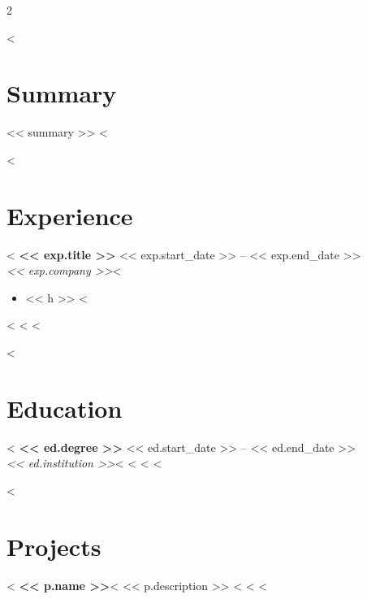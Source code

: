 \documentclass[10pt,a4paper]{article}
\begin{document}
\begin{paracol}{2}
\switchcolumn

<%
\section*{Summary}
<< summary >>
<%

<%
\section*{Experience}
<%
\textbf{<< exp.title >>} \hfill << exp.start_date >> -- << exp.end_date >>\\
\textit{<< exp.company >>}<%
\begin{itemize}
<%
    \item << h >>
<%
\end{itemize}
<%
\vspace{4pt}
<%
<%

<%
\section*{Education}
<%
\textbf{<< ed.degree >>} \hfill << ed.start_date >> -- << ed.end_date >>\\
\textit{<< ed.institution >>}<%
<%
\vspace{4pt}
<%
<%

<%
\section*{Projects}
<%
\textbf{<< p.name >>}<%
<< p.description >>
<%
\vspace{4pt}
<%
<%

\end{paracol}
\end{document}
